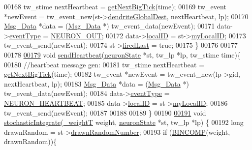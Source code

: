 \begin{DoxyCode}
00168     tw\_stime nextHeartbeat = \hyperlink{assist_8c_aa961bc9b414f1429b123fc8212c989fd}{getNextBigTick}(time);
00169     tw\_event *newEvent = tw\_event\_new(st->\hyperlink{structneuron_state_a4199c14c5aabfd52f441e01623bdc84c}{dendriteGlobalDest}, nextHeartbeat, lp);
00170     \hyperlink{struct_msg___data}{Msg\_Data} *data = (\hyperlink{struct_msg___data}{Msg\_Data} *) tw\_event\_data(newEvent);
00171     data->\hyperlink{struct_msg___data_a015b6eb45982e1842ee8fc389a099ced}{eventType} = \hyperlink{assist_8h_a7c1688de451e0dea1e11617bce3ec450a777cedd6ca25a5d7a84aab10a8735af0}{NEURON\_OUT};
00172     data->\hyperlink{struct_msg___data_aefc820e92a74047ec7ed74c1c45f818f}{localID} = st->\hyperlink{structneuron_state_ac24762c24aede292a2ce5df78114881c}{myLocalID};
00173     tw\_event\_send(newEvent);
00174     st->\hyperlink{structneuron_state_a287eb8703dbfb177165d31c8840646b8}{firedLast} = \textcolor{keyword}{true};
00175 \}
00176 
00177 
00178 
\hypertarget{neuron_8c_source_l00179}{}\hyperlink{neuron_8h_a766dff9e530486b055e97ebe392268b8}{00179} \textcolor{keywordtype}{void} \hyperlink{neuron_8c_a766dff9e530486b055e97ebe392268b8}{sendHeartbeat}(\hyperlink{structneuron_state}{neuronState} *st, tw\_lp *lp, tw\_stime time)\{
00180         \textcolor{comment}{//heartbeat message gen:}
00181     tw\_stime nextHeartbeat = \hyperlink{assist_8c_aa961bc9b414f1429b123fc8212c989fd}{getNextBigTick}(time);
00182     tw\_event *newEvent = tw\_event\_new(lp->gid, nextHeartbeat, lp);
00183     \hyperlink{struct_msg___data}{Msg\_Data} *data = (\hyperlink{struct_msg___data}{Msg\_Data} *) tw\_event\_data(newEvent);
00184     data->\hyperlink{struct_msg___data_a015b6eb45982e1842ee8fc389a099ced}{eventType} = \hyperlink{assist_8h_a7c1688de451e0dea1e11617bce3ec450a226690009a653238a52339561e6c466e}{NEURON\_HEARTBEAT};
00185     data->\hyperlink{struct_msg___data_aefc820e92a74047ec7ed74c1c45f818f}{localID} = st->\hyperlink{structneuron_state_ac24762c24aede292a2ce5df78114881c}{myLocalID};
00186     tw\_event\_send(newEvent);
00187 
00188 
00189 \}
00190 
\hypertarget{neuron_8c_source_l00191}{}\hyperlink{neuron_8h_afee2e0acc66d8d10aee8d52c8d245c82}{00191} \textcolor{keywordtype}{void} \hyperlink{neuron_8c_afee2e0acc66d8d10aee8d52c8d245c82}{stochasticIntegrate}(\hyperlink{assist_8h_aa73c5ea0fe4ba938c96e6771b38dcb2a}{\_weightT} weight, \hyperlink{structneuron_state}{neuronState} *st, tw\_lp *lp)
      \{
00192     \textcolor{keywordtype}{long} drawnRandom = st->\hyperlink{structneuron_state_a296a4f04813c4882d6acd8c9074abd35}{drawnRandomNumber};
00193     \textcolor{keywordflow}{if} (\hyperlink{assist_8h_abbf94867faa4abd8c53c87576efd05f3}{BINCOMP}(weight, drawnRandom))\{

\end{DoxyCode}
